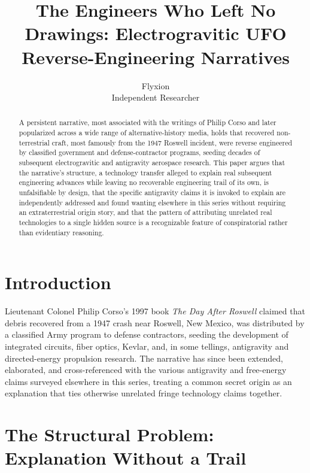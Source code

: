 \documentclass[11pt]{article}
\title{The Engineers Who Left No Drawings: Electrogravitic UFO Reverse-Engineering Narratives}
\author{Flyxion \\ \small Independent Researcher}
\date{}
\begin{document}
\maketitle

\begin{abstract}
A persistent narrative, most associated with the writings of Philip Corso and later popularized across a wide range of alternative-history media, holds that recovered non-terrestrial craft, most famously from the 1947 Roswell incident, were reverse engineered by classified government and defense-contractor programs, seeding decades of subsequent electrogravitic and antigravity aerospace research. This paper argues that the narrative's structure, a technology transfer alleged to explain real subsequent engineering advances while leaving no recoverable engineering trail of its own, is unfalsifiable by design, that the specific antigravity claims it is invoked to explain are independently addressed and found wanting elsewhere in this series without requiring an extraterrestrial origin story, and that the pattern of attributing unrelated real technologies to a single hidden source is a recognizable feature of conspiratorial rather than evidentiary reasoning.
\end{abstract}

\section{Introduction}

Lieutenant Colonel Philip Corso's 1997 book \emph{The Day After Roswell} claimed that debris recovered from a 1947 crash near Roswell, New Mexico, was distributed by a classified Army program to defense contractors, seeding the development of integrated circuits, fiber optics, Kevlar, and, in some tellings, antigravity and directed-energy propulsion research. The narrative has since been extended, elaborated, and cross-referenced with the various antigravity and free-energy claims surveyed elsewhere in this series, treating a common secret origin as an explanation that ties otherwise unrelated fringe technology claims together.

\section{The Structural Problem: Explanation Without a Trail}
\end{document}
